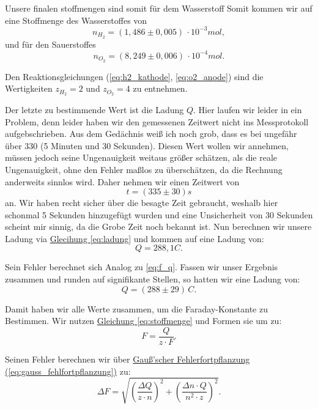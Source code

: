 Unsere finalen stoffmengen sind somit für dem Wasserstoff
Somit kommen wir auf eine Stoffmenge des Wasserstoffes von
\begin{equation}
    \boxed{
        n_{H_2} = (1,486 \pm 0,005) \, \cdot 10^{-3} mol, 
    }
\end{equation}
und für den Sauerstoffes 
\begin{equation}
    \boxed{
        n_{O_2} = (8,249 \pm 0,006) \, \cdot 10^{-4} mol.
    }
\end{equation}

Den Reaktionsgleichungen (\ref{eq:h2_kathode}, \ref{eq:o2_anode}) sind die Wertigkeiten $z_{H_2} = 2$ und $z_{O_2} = 4$ zu entnehmen.

Der letzte zu bestimmende Wert ist die Ladung $Q$. Hier laufen wir leider in ein Problem, denn leider haben wir den gemessenen Zeitwert nicht ins Messprotokoll aufgebschrieben. 
Aus dem Gedächnis weiß ich noch grob, dass es bei ungefähr über $330$ (5 Minuten und 30 Sekunden). Diesen Wert wollen wir annehmen, müssen jedoch seine Ungenauigkeit weitaus größer schätzen, als die reale Ungenauigkeit, 
ohne den Fehler maßlos zu überschätzen, da die Rechnung anderweits sinnlos wird. Daher nehmen wir einen Zeitwert von 
\begin{equation}
    t = (335 \pm 30)s
\end{equation}
an. Wir haben recht sicher über die besagte Zeit gebraucht, weshalb hier schonmal 5 Sekunden hinzugefügt wurden und eine Unsicherheit von 30 Sekunden scheint mir sinnig, da die Grobe Zeit noch bekannt ist.
Nun berechnen wir unsere Ladung via \hyperref[eq:ladung]{Glecihung \ref*{eq:ladung}} und kommen auf eine Ladung von:
\begin{equation}
    Q = 288,1 C. 
\end{equation}

Sein Fehler berechnet sich Analog zu \ref{eq:f_q}. Fassen wir unser Ergebnis zusammen und runden auf signifikante Stellen, so hatten wir eine Ladung von:
\begin{equation}
    \boxed{Q = (288 \pm 29) \, C}.
\end{equation}

Damit haben wir alle Werte zusammen, um die Faraday-Konstante zu Bestimmen. Wir nutzen \hyperref[eq:stoffmenge]{Gleichung \ref*{eq:stoffmenge}} und Formen sie um zu:
\begin{equation}
    F = \frac{Q}{z \cdot F}.
\end{equation}

Seinen Fehler berechnen wir über \hyperref[eq:gauss_fehlfortpflanzung]{Gauß'scher Fehlerfortpflanzung (\ref*{eq:gauss_fehlfortpflanzung})} zu:
\begin{equation}
    \Delta F = \sqrt{\left(\frac{\Delta Q}{z \cdot n}\right)^2 + \left(\frac{\Delta n \cdot  Q}{n^2 \cdot z}\right)^2}.
\end{equation}

